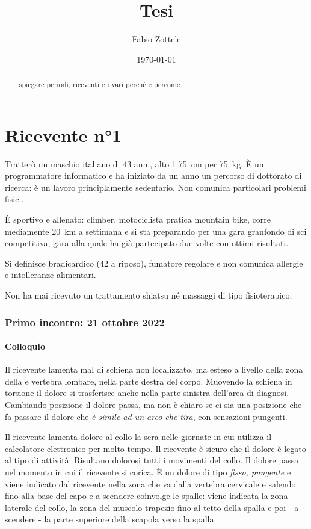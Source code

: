 \documentclass[12pt, openright, twoside]{report}
\newcommand{\RNum}[1]{\uppercase\expandafter{\romannumeral #1\relax}}
\begin{document}
\title{Tesi}
\author{Fabio Zottele}
\date{\today}
\maketitle
\begin{abstract}
spiegare periodi, riceventi e i vari perché e percome...
\end{abstract}
\chapter*{Ricevente n°1}
Tratterò un maschio italiano di 43 anni, alto \SI{1,75}{\centi\metre}
per \SI{75}{\kilogram}. \`{E} un programmatore informatico e ha iniziato da un
anno un percorso di dottorato di ricerca: è un lavoro principlamente sedentario.
Non comunica particolari problemi fisici.

\`{E} sportivo e allenato: climber, motociclista pratica mountain bike, corre
mediamente \SI{20}{\kilo\metre} a settimana e si sta preparando per una gara
granfondo di sci competitiva, gara alla quale ha già partecipato due volte con
ottimi risultati.

Si definisce bradicardico (\SI{42}{\bpm} a riposo), fumatore regolare
e non comunica allergie e intolleranze alimentari.

Non ha mai ricevuto un trattamento shiatsu né massaggi di tipo fisioterapico.
\subsection*{Primo incontro: 21 ottobre 2022}
\subsubsection{Colloquio}
Il ricevente lamenta mal di schiena non localizzato, ma esteso a livello della
zona della \RNum{1} e \RNum{2} vertebra lombare, nella parte destra del corpo.
Muovendo la schiena in torsione il dolore si trasferisce anche nella parte
sinistra dell'area di diagnosi.
Cambiando posizione il dolore passa, ma non è chiaro se ci sia una posizione che
fa passare il dolore che \textit{è simile ad un arco che tira}, con sensazioni
pungenti.

Il ricevente lamenta dolore al collo la sera nelle giornate in cui utilizza il
calcolatore elettronico per molto tempo.
Il ricevente è sicuro che il dolore è legato al tipo di attività.
Risultano dolorosi tutti i movimenti del collo.
Il dolore passa nel momento in cui il ricevente si corica.
\`{E} un dolore di tipo \textit{fisso, pungente} e viene indicato dal ricevente
nella zona che va dalla \RNum{7} vertebra cervicale e salendo fino alla base del
capo e a scendere coinvolge le spalle: viene indicata la zona laterale del
collo, la zona del muscolo trapezio fino al tetto della spalla e poi - a
scendere - la parte superiore della scapola verso la spalla.
\end{document}
